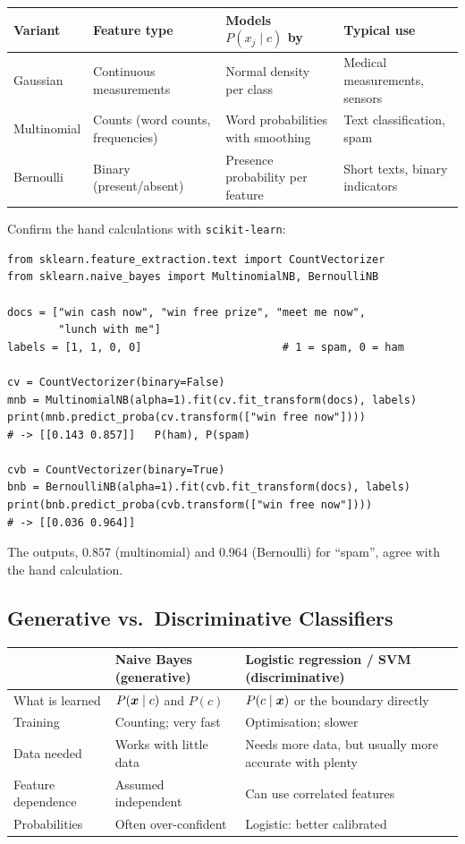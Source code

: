 \begin{center}
\begin{tabular}{@{}p{2.8cm}p{3.2cm}p{3.6cm}p{3.9cm}@{}}
\toprule
\textbf{Variant} & \textbf{Feature type} & \textbf{Models $P(x_j\mid c)$ by} & \textbf{Typical use}\\
\midrule
Gaussian & Continuous measurements & Normal density per class & Medical measurements, sensors\\
Multinomial & Counts (word counts, frequencies) & Word probabilities with smoothing & Text classification, spam\\
Bernoulli & Binary (present/absent) & Presence probability per feature & Short texts, binary indicators\\
\bottomrule
\end{tabular}
\end{center}

\begin{tryit}
Confirm the hand calculations with \texttt{scikit-learn}:
\begin{lstlisting}
from sklearn.feature_extraction.text import CountVectorizer
from sklearn.naive_bayes import MultinomialNB, BernoulliNB

docs = ["win cash now", "win free prize", "meet me now",
        "lunch with me"]
labels = [1, 1, 0, 0]                      # 1 = spam, 0 = ham

cv = CountVectorizer(binary=False)
mnb = MultinomialNB(alpha=1).fit(cv.fit_transform(docs), labels)
print(mnb.predict_proba(cv.transform(["win free now"])))
# -> [[0.143 0.857]]   P(ham), P(spam)

cvb = CountVectorizer(binary=True)
bnb = BernoulliNB(alpha=1).fit(cvb.fit_transform(docs), labels)
print(bnb.predict_proba(cvb.transform(["win free now"])))
# -> [[0.036 0.964]]
\end{lstlisting}
The outputs, $0.857$ (multinomial) and $0.964$ (Bernoulli) for ``spam'', agree with the hand calculation.
\end{tryit}

\subsection{Generative vs.\ Discriminative Classifiers}

\begin{center}
\begin{tabular}{@{}p{3.4cm}p{5.2cm}p{5.2cm}@{}}
\toprule
 & \textbf{Naive Bayes (generative)} & \textbf{Logistic regression / SVM (discriminative)}\\
\midrule
What is learned & $P(\boldsymbol{x}\mid c)$ and $P(c)$ & $P(c\mid\boldsymbol{x})$ or the boundary directly\\
Training & Counting; very fast & Optimisation; slower\\
Data needed & Works with little data & Needs more data, but usually more accurate with plenty\\
Feature dependence & Assumed independent & Can use correlated features\\
Probabilities & Often over-confident & Logistic: better calibrated\\
\bottomrule
\end{tabular}
\end{center}

